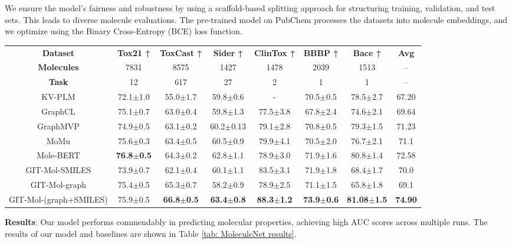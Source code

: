 \documentclass{article}
\begin{document}
We ensure the model's fairness and robustness by using a scaffold-based splitting approach for structuring training, validation, and test sets. This leads to diverse molecule evaluations. The pre-trained model on PubChem processes the datasets into molecule embeddings, and we optimize using the Binary Cross-Entropy (BCE) loss function.
\begin{table*}[t]
	\centering
    \caption{ \textbf{Results for molecular property prediction (classification)}. The combined use of \textbf{SMILES} and \textbf{2D graphs} enhances our multi-modal molecular representation, which outperforms both single-modal models and other multi-modal approaches.}
    \label{tab: MoleculeNet results} 
	\begin{tabular}{c|c|c|c|c|c|c|c}
	\hline
	\textbf{Dataset} & \textbf{Tox21 ↑} & \textbf{ToxCast ↑} & \textbf{Sider ↑} & \textbf{ClinTox ↑} & \textbf{BBBP ↑}& \textbf{Bace ↑}&\textbf{Avg}\\
        \textbf{Molecules} & 7831 & 8575 & 1427 & 1478 & 2039& 1513&--\\
        \textbf{Task} & 12 & 617 & 27 & 2 & 1& 1&--\\
		\hline
        KV-PLM & 72.1$\pm$1.0 & 55.0$\pm$1.7 & 59.8$\pm$0.6 & - & 70.5$\pm$0.5 & 78.5$\pm$2.7 
        & 67.20  \\
        GraphCL & 75.1$\pm$0.7 & 63.0$\pm$0.4 & 59.8$\pm$1.3 & 77.5$\pm$3.8 & 67.8$\pm$2.4 & 74.6$\pm$2.1
        & 69.64 \\
        GraphMVP & 74.9$\pm$0.5 & 63.1$\pm$0.2 & 60.2$\pm$0.13 & 79.1$\pm$2.8 & 70.8$\pm$0.5 & 79.3$\pm$1.5
        & 71.23 \\
        MoMu & 75.6$\pm$0.3 & 63.4$\pm$0.5 & 60.5$\pm$0.9 & 79.9$\pm$4.1 & 70.5$\pm$2.0 & 76.7$\pm$2.1
        & 71.1 \\
        Mole-BERT & \textbf{76.8$\pm$0.5 }& 64.3$\pm$0.2 & 62.8$\pm$1.1 & 78.9$\pm$3.0 
        & 71.9$\pm$1.6 & 80.8$\pm$1.4 &72.58 \\
        \hline
        GIT-Mol-SMILES & 73.9$\pm$0.7 & 62.1$\pm$0.4 & 60.1$\pm$1.1 & 83.5$\pm$3.1 & 71.9$\pm$1.8 & 68.4$\pm$1.7 & 70.0 \\
        GIT-Mol-graph & 75.4$\pm$0.5 & 65.3$\pm$0.7 & 58.2$\pm$0.9 & 78.9$\pm$2.5 & 71.1$\pm$1.5 & 
        65.8$\pm$1.8 & 69.1 \\
        GIT-Mol-(graph+SMILES) & 75.9$\pm$0.5 &\textbf{66.8$\pm$0.5} & \textbf{63.4$\pm$0.8} & 
        \textbf{88.3$\pm$1.2}& 
        \textbf{73.9$\pm$0.6} & 
        \textbf{81.08$\pm$1.5} & 
        \textbf{74.90} \\
		\hline
	\end{tabular}
\end{table*}
\textbf{Results}: Our model performs commendably in predicting molecular properties, achieving high AUC scores across multiple runs. The results of our model and baselines are shown in Table \ref{tab: MoleculeNet results}. 
\end{document}
